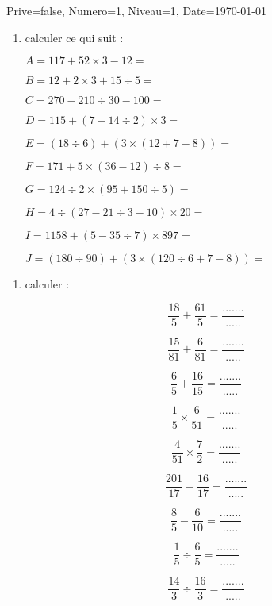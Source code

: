 \documentclass[a4paper,12pt]{article}
\begin{document}
\begin{Maquette}[DM]{Prive=false, Numero=1, Niveau=1, Date=\today}

\begin{exercice}
\begin{multicols}{2}
\begin{enumerate}[font=\bfseries]
\item calculer ce qui suit :
		
$ A=117+52\times 3-12=$

$ B=12+2\times 3+15\div 5=$

$ C=270-210\div 30-100=$

$ D=115+(7-14\div 2)\times 3=$

$ E=(18\div 6)+(3\times(12+7-8))=$
		
$ F=171+5\times( 36-12)\div 8=$

$ G=124\div 2\times( 95+150\div 5)=$

$ H=4\div(27-21\div 3-10)\times 20=$

$ I=1158+(5-35\div 7)\times 897=$

$ J=(180\div 90)+(3\times(120\div 6+7-8))=$
	\end{enumerate}
	\end{multicols}
	
\end{exercice}

\begin{exercice}
	\begin{enumerate}
		\item calculer :
		\end{enumerate}
\begin{multicols}{2}		

\[\dfrac{18}{5}+\dfrac{61}{5}=\dfrac{.......}{.....}\]

\[\dfrac{15}{81}+\dfrac{6}{81}=\dfrac{.......}{.....}\]

\[\dfrac{6}{5}+\dfrac{16}{15}=\dfrac{.......}{.....}\]

\[\dfrac{1}{5}\times \dfrac{6}{51}=\dfrac{.......}{.....}\]

\[\dfrac{4}{51}\times\dfrac{7}{2}=\dfrac{.......}{.....}\]


\end{multicols}
\[\dfrac{201}{17}-\dfrac{16}{17}=\dfrac{.......}{.....}\]

\[\dfrac{8}{5}-\dfrac{6}{10}=\dfrac{.......}{.....}\]

\[\dfrac{1}{5}\div\dfrac{6}{5}=\dfrac{.......}{.....}\]

\[\dfrac{14}{3}\div\dfrac{16}{3}=\dfrac{.......}{.....}\]
		

\end{exercice}
\end{Maquette}
\end{document}
